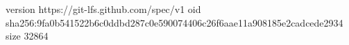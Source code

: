 version https://git-lfs.github.com/spec/v1
oid sha256:9fa0b541522b6c0ddbd287c0e590074406c26f6aae11a908185e2cadcede2934
size 32864
